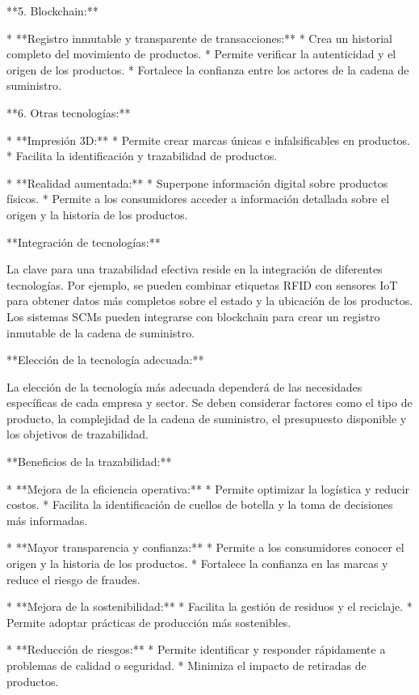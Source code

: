 \documentclass[main.tex]{subfiles}
\begin{document}
**5. Blockchain:**

* **Registro inmutable y transparente de transacciones:**
    * Crea un historial completo del movimiento de productos.
    * Permite verificar la autenticidad y el origen de los productos.
    * Fortalece la confianza entre los actores de la cadena de suministro.

**6. Otras tecnologías:**

* **Impresión 3D:**
    * Permite crear marcas únicas e infalsificables en productos.
    * Facilita la identificación y trazabilidad de productos.

* **Realidad aumentada:**
    * Superpone información digital sobre productos físicos.
    * Permite a los consumidores acceder a información detallada sobre el origen y la historia de los productos.

**Integración de tecnologías:**

La clave para una trazabilidad efectiva reside en la integración de diferentes tecnologías. Por ejemplo, se pueden combinar etiquetas RFID con sensores IoT para obtener datos más completos sobre el estado y la ubicación de los productos. Los sistemas SCMs pueden integrarse con blockchain para crear un registro inmutable de la cadena de suministro.

**Elección de la tecnología adecuada:**

La elección de la tecnología más adecuada dependerá de las necesidades específicas de cada empresa y sector. Se deben considerar factores como el tipo de producto, la complejidad de la cadena de suministro, el presupuesto disponible y los objetivos de trazabilidad.

**Beneficios de la trazabilidad:**

* **Mejora de la eficiencia operativa:**
    * Permite optimizar la logística y reducir costos.
    * Facilita la identificación de cuellos de botella y la toma de decisiones más informadas.

* **Mayor transparencia y confianza:**
    * Permite a los consumidores conocer el origen y la historia de los productos.
    * Fortalece la confianza en las marcas y reduce el riesgo de fraudes.

* **Mejora de la sostenibilidad:**
    * Facilita la gestión de residuos y el reciclaje.
    * Permite adoptar prácticas de producción más sostenibles.

* **Reducción de riesgos:**
    * Permite identificar y responder rápidamente a problemas de calidad o seguridad.
    * Minimiza el impacto de retiradas de productos.
\end{document}

